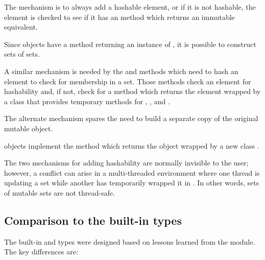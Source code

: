 The mechanism is to always add a hashable element, or if it is not
hashable, the element is checked to see if it has an
 method which returns an immutable equivalent.

Since  objects have a  method
returning an instance of , it is possible to
construct sets of sets.

A similar mechanism is needed by the  and
 methods which need to hash an element to check
for membership in a set.  Those methods check an element for hashability
and, if not, check for a  method
which returns the element wrapped by a class that provides temporary
methods for , , and .

The alternate mechanism spares the need to build a separate copy of
the original mutable object.

 objects implement the 
method which returns the  object wrapped by a new class
.

The two mechanisms for adding hashability are normally invisible to the
user; however, a conflict can arise in a multi-threaded environment
where one thread is updating a set while another has temporarily wrapped it
in .  In other words, sets of mutable sets
are not thread-safe.


\subsection{Comparison to the built-in  types
            \label{comparison-to-builtin-set}}

The built-in  and  types were designed based
on lessons learned from the  module.  The key differences are:

